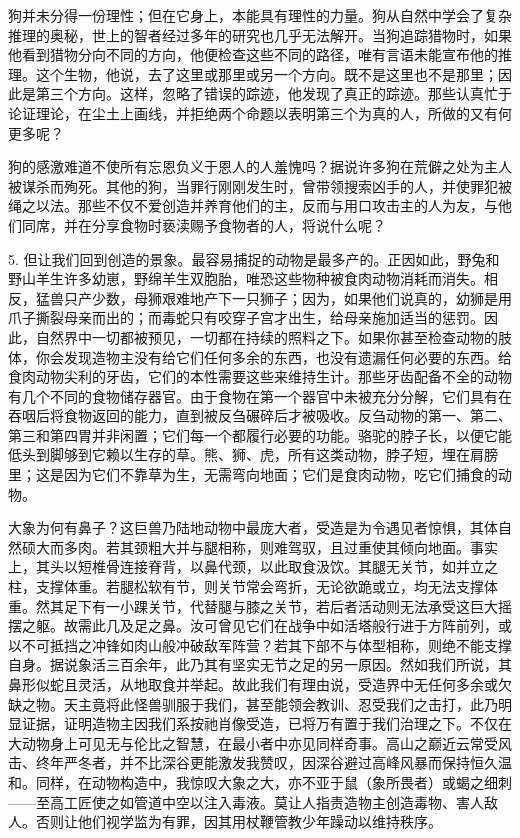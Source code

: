 狗并未分得一份理性；但在它身上，本能具有理性的力量。狗从自然中学会了复杂推理的奥秘，世上的智者经过多年的研究也几乎无法解开。当狗追踪猎物时，如果他看到猎物分向不同的方向，他便检查这些不同的路径，唯有言语未能宣布他的推理。这个生物，他说，去了这里或那里或另一个方向。既不是这里也不是那里；因此是第三个方向。这样，忽略了错误的踪迹，他发现了真正的踪迹。那些认真忙于论证理论，在尘土上画线，并拒绝两个命题以表明第三个为真的人，所做的又有何更多呢？\par

狗的感激难道不使所有忘恩负义于恩人的人羞愧吗？据说许多狗在荒僻之处为主人被谋杀而殉死。其他的狗，当罪行刚刚发生时，曾带领搜索凶手的人，并使罪犯被绳之以法。那些不仅不爱创造并养育他们的主，反而与用口攻击主的人为友，与他们同席，并在分享食物时亵渎赐予食物者的人，将说什么呢？\par

5. 但让我们回到创造的景象。最容易捕捉的动物是最多产的。正因如此，野兔和野山羊生许多幼崽，野绵羊生双胞胎，唯恐这些物种被食肉动物消耗而消失。相反，猛兽只产少数，母狮艰难地产下一只狮子；因为，如果他们说真的，幼狮是用爪子撕裂母亲而出的；而毒蛇只有咬穿子宫才出生，给母亲施加适当的惩罚。因此，自然界中一切都被预见，一切都在持续的照料之下。如果你甚至检查动物的肢体，你会发现造物主没有给它们任何多余的东西，也没有遗漏任何必要的东西。给食肉动物尖利的牙齿，它们的本性需要这些来维持生计。那些牙齿配备不全的动物有几个不同的食物储存器官。由于食物在第一个器官中未被充分分解，它们具有在吞咽后将食物返回的能力，直到被反刍碾碎后才被吸收。反刍动物的第一、第二、第三和第四胃并非闲置；它们每一个都履行必要的功能。骆驼的脖子长，以便它能低头到脚够到它赖以生存的草。熊、狮、虎，所有这类动物，脖子短，埋在肩膀里；这是因为它们不靠草为生，无需弯向地面；它们是食肉动物，吃它们捕食的动物。\par

大象为何有鼻子？这巨兽乃陆地动物中最庞大者，受造是为令遇见者惊惧，其体自然硕大而多肉。若其颈粗大并与腿相称，则难驾驭，且过重使其倾向地面。事实上，其头以短椎骨连接脊背，以鼻代颈，以此取食汲饮。其腿无关节，如并立之柱，支撑体重。若腿松软有节，则关节常会弯折，无论欲跪或立，均无法支撑体重。然其足下有一小踝关节，代替腿与膝之关节，若后者活动则无法承受这巨大摇摆之躯。故需此几及足之鼻。\newline{}汝可曾见它们在战争中如活塔般行进于方阵前列，或以不可抵挡之冲锋如肉山般冲破敌军阵营？若其下部不与体型相称，则绝不能支撑自身。\newline{}据说象活三百余年，此乃其有坚实无节之足的另一原因。然如我们所说，其鼻形似蛇且灵活，从地取食并举起。故此我们有理由说，受造界中无任何多余或欠缺之物。\newline{}天主竟将此怪兽驯服于我们，甚至能领会教训、忍受我们之击打，此乃明显证据，证明造物主因我们系按祂肖像受造，已将万有置于我们治理之下。\newline{}不仅在大动物身上可见无与伦比之智慧，在最小者中亦见同样奇事。高山之巅近云常受风击、终年严冬者，并不比深谷更能激发我赞叹，因深谷避过高峰风暴而保持恒久温和。同样，在动物构造中，我惊叹大象之大，亦不亚于鼠（象所畏者）或蝎之细刺——至高工匠使之如管道中空以注入毒液。\newline{}莫让人指责造物主创造毒物、害人敌人。否则让他们视学监为有罪，因其用杖鞭管教少年躁动以维持秩序。\par

